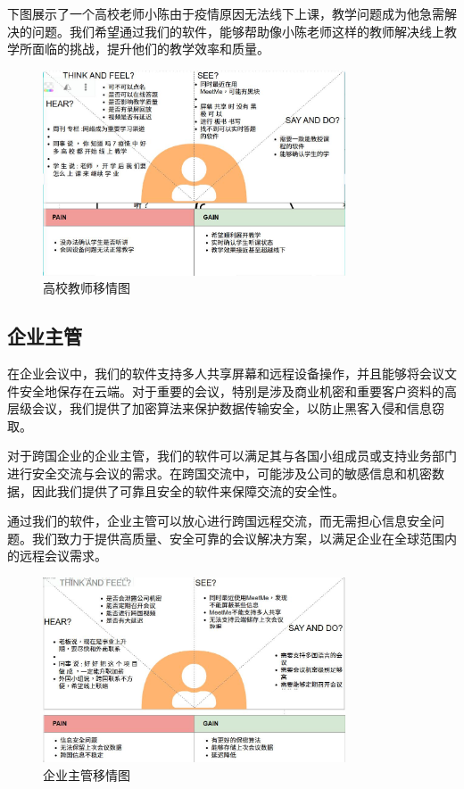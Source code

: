 \documentclass[a4paper,12pt]{article}
\begin{document}
    下图展示了一个高校老师小陈由于疫情原因无法线下上课，教学问题成为他急需解决的问题。我们希望通过我们的软件，能够帮助像小陈老师这样的教师解决线上教学所面临的挑战，提升他们的教学效率和质量。
    \begin{figure}[h]
        \centering
        \includegraphics[width=0.8\textwidth]{高校移情图.jpg}
        \caption{高校教师移情图}
    \end{figure}
    \clearpage


    \subsection{企业主管}
    在企业会议中，我们的软件支持多人共享屏幕和远程设备操作，并且能够将会议文件安全地保存在云端。对于重要的会议，特别是涉及商业机密和重要客户资料的高层级会议，我们提供了加密算法来保护数据传输安全，以防止黑客入侵和信息窃取。

    对于跨国企业的企业主管，我们的软件可以满足其与各国小组成员或支持业务部门进行安全交流与会议的需求。在跨国交流中，可能涉及公司的敏感信息和机密数据，因此我们提供了可靠且安全的软件来保障交流的安全性。

    通过我们的软件，企业主管可以放心进行跨国远程交流，而无需担心信息安全问题。我们致力于提供高质量、安全可靠的会议解决方案，以满足企业在全球范围内的远程会议需求。
    \begin{figure}[h]
        \centering
        \includegraphics[width=0.8\textwidth]{企业移情图.jpg}
        \caption{企业主管移情图}
    \end{figure}
    \clearpage
\end{document}
